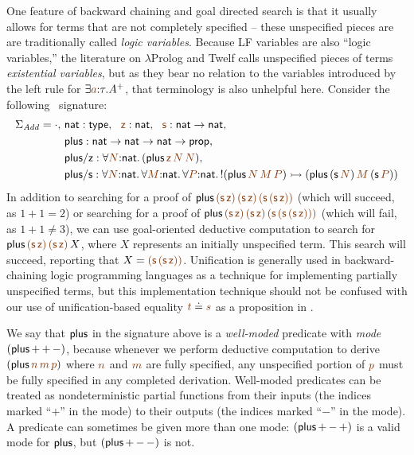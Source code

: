 One feature of backward chaining and goal directed search is that it
usually allows for terms that are not completely specified -- these
unspecified pieces are are traditionally called {\it logic
  variables}. Because LF variables are also ``logic variables,''
the literature on $\lambda$Prolog and Twelf calls unspecified
pieces of terms {\it existential variables}, 
but as they bear no relation to the variables introduced
by the left rule for $\exists \lf{a}{:}\tau. A^+$, 
that terminology is also unhelpful
here. Consider the following \sls~signature:
\begin{align*}
 \Sigma_{\it Add} = \cdot, 
~&{\sf nat} : {\sf type}, 
~~\lf{\sf z} : {\sf nat}, 
~~\lf{\sf s} : {\sf nat} \rightarrow {\sf nat},\\
~&{\sf plus} : {\sf nat} \rightarrow {\sf nat} \rightarrow {\sf nat} 
                 \rightarrow {\sf prop},\\
~&{\sf plus/z} : \forall \lf{N}{:}{\sf nat}.\,
({\sf plus}\,\lf{\sf z}\,\lf{N}\,\lf{N}),\\
~&{\sf plus/s} : \forall \lf{N}{:}{\sf nat}.\, 
                 \forall \lf{M}{:}{\sf nat}.\, 
                 \forall \lf{P}{:}{\sf nat}.\,
{!}({\sf plus}\,\lf{N}\,\lf{M}\,\lf{P})
\lefti ({\sf plus}\,({\sf s}\,\lf{N})\,\lf{M}\,({\sf s}\,\lf{P}))
\end{align*}
In addition to searching for a proof of ${\sf plus}\,\lf{\sf
  (s\,z)}\,\lf{\sf (s\,z)}\,\lf{\sf (s\,(s\,z))}$ (which will succeed,
as $1 + 1 = 2$) or searching for a proof of ${\sf plus}\,\lf{\sf
  (s\,z)}\,\lf{\sf (s\,z)}\,\lf{\sf (s\,(s\,(s\,z)))}$ (which will
fail, as $1 + 1 \neq 3$), we can use goal-oriented deductive
computation to search for ${\sf plus}\,\lf{\sf (s\,z)}\,\lf{\sf
  (s\,z)}\,X$, where $X$ represents an initially unspecified term.
This search will succeed, reporting that $X = \lf{\sf
  (s\,(s\,z))}$. Unification is generally used in backward-chaining
logic programming languages as a technique for implementing partially
unspecified terms, but this implementation technique should not be
confused with our use of unification-based equality $\lf{t} \doteq
\lf{s}$ as a proposition in \sls.

We say that ${\sf plus}$ in the signature above is a {\it well-moded}
predicate with {\it mode} $({\sf plus}\,{+}\,{+}\,{-})$, because
whenever we perform deductive computation to derive $({\sf
  plus}\,\lf{n}\,\lf{m}\,\lf{p})$ where $\lf{n}$ and $\lf{m}$ are
fully specified, any unspecified portion of $\lf{p}$ must be fully
specified in any completed derivation. Well-moded predicates can be
treated as nondeterministic partial functions from their inputs (the
indices marked ``${+}$'' in the mode) to their outputs (the indices
marked ``${-}$'' in the mode). A predicate can sometimes be given more
than one mode: $({\sf plus}\,{+}\,{-}\,{+})$ is a valid mode for ${\sf
  plus}$, but $({\sf plus}\,{+}\,{-}\,{-})$ is not.

